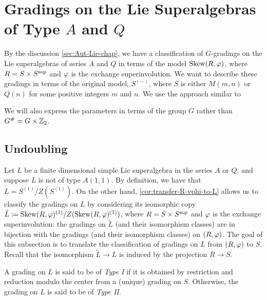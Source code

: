 \section{Gradings on the Lie Superalgebras of Type \texorpdfstring{$A$ and $Q$}{A and Q}}

By the discussion \cref{sec:Aut-Lie-chap}, we have a classification of $G$-gradings on the Lie superalgebras of series $A$ and $Q$ in terms of the model $\operatorname{Skew}(R, \varphi)$, where $R = S\times S^{\mathrm{sop}}$ and $\varphi$ is the exchange superinvolution. 
We want to describe these gradings in terms of the original model, $S^{(-)}$, where $S$ is either $M(m,n)$ or $Q(n)$ for some positive integers $m$ and $n$. 
We use the approach similar to \cite[Appendix]{paper-adrian}

We will also express the parameters in terms of the group $G$ rather than $G^\# =G \times \mathbb{Z}_2$. 
 
\subsection{Undoubling}\label{ssec:undoubling}

Let $L$ be a finite dimensional simple Lie superalgebra in the series $A$ or $Q$, and suppose $L$ is not of type $A(1,1)$. 
By definition, we have that $L = S^{(1)}/Z(S^{(1)})$. 
On the other hand, \cref{cor:transfer-R-vphi-to-L} allows us to classify the gradings on $L$ by considering its isomorphic copy $\tilde L \coloneqq \operatorname{Skew}(R, \varphi)^{(1)}/Z(\operatorname{Skew}(R, \varphi)^{(1)})$, where $R = S\times S^{\mathrm{sop}}$ and $\varphi$ is the exchange superinvolution:
the gradings on $\tilde L$ (and their isomorphism classes) are in bijection with the gradings (and their isomorphism classes) on $(R, \varphi)$. 
The goal of this subsection is to translate the classification of gradings on $L$ from $(R, \varphi)$ to $S$. 
Recall that the isomorphism $\tilde L \to L$ is induced by the projection $R \to S$. 

\begin{defi}\label{defi:types-I-and-II}
    A grading on $L$ is said to be of \emph{Type I} if it is obtained by restriction and reduction modulo the center from a (unique) grading on $S$. 
    Otherwise, the grading on $L$ is said to be of \emph{Type II}. 
\end{defi}

